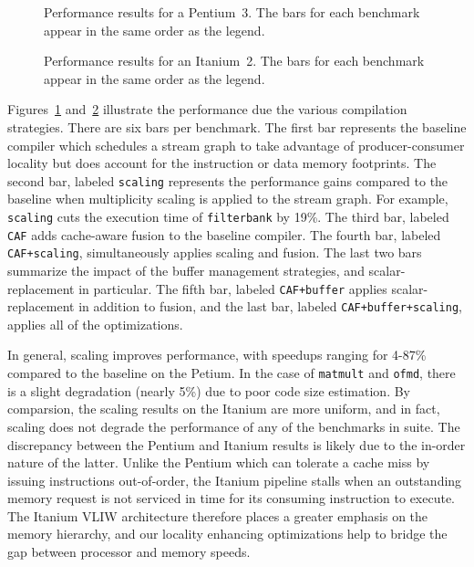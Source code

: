 
\begin{figure}[t]
  \vspace{-24pt}
  \hspace{-0.3in}
  \vspace{-48pt}
  \caption{Performance results for a Pentium~3.  The bars for each
  benchmark appear in the same order as the legend.}
  \label{fig:results-p3}
  \vspace{-6pt}
\end{figure}

\begin{figure}[t]
  \vspace{-36pt}
  \hspace{-0.3in}
  \vspace{-48pt}
  \caption{Performance results for an Itanium~2.  The bars for each
  benchmark appear in the same order as the legend.}
  \label{fig:results-ipf}
  \vspace{-12pt}
\end{figure}

Figures~\ref{fig:results-p3} and~\ref{fig:results-ipf} illustrate the
performance due the various compilation strategies. There are six bars
per benchmark. The first bar represents the baseline compiler which
schedules a stream graph to take advantage of producer-consumer
locality but does account for the instruction or data memory
footprints. The second bar, labeled {\tt scaling} represents the
performance gains compared to the baseline when multiplicity scaling
is applied to the stream graph. For example, {\tt scaling} cuts the
execution time of \texttt{filterbank} by 19\%. The third bar, labeled
{\tt CAF} adds cache-aware fusion to the baseline compiler. The fourth
bar, labeled \texttt{CAF+scaling}, simultaneously applies scaling and
fusion. The last two bars summarize the impact of the buffer
management strategies, and scalar-replacement in particular. 
The fifth bar, labeled \texttt{CAF+buffer}
applies scalar-replacement in addition to fusion, and the last bar,
labeled \texttt{CAF+buffer+scaling}, applies all of the optimizations.

In general, scaling improves performance, with speedups ranging for
4-87\% compared to the baseline on the Petium. In the case of
\texttt{matmult} and \texttt{ofmd}, there is a slight degradation
(nearly 5\%) due to poor code size estimation. By comparsion, the
scaling results on the 
Itanium are more uniform, and in fact, scaling does not degrade the
performance of any of the benchmarks in suite. The discrepancy between
the Pentium and Itanium results is likely due to the in-order
nature of the latter. Unlike the Pentium which can tolerate a cache
miss by issuing instructions out-of-order, the Itanium pipeline stalls
when an outstanding memory request is not serviced in time for
its consuming instruction to execute. The Itanium VLIW architecture
therefore places a greater emphasis on the memory hierarchy, and our
locality enhancing optimizations help to bridge the gap between
processor and memory speeds.

